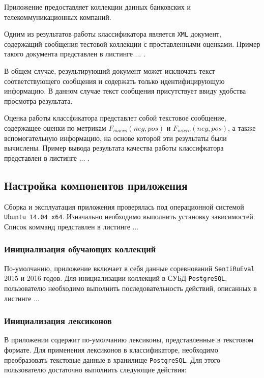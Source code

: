     Приложение предоставляет коллекции данных банковских и телекоммуникационных
    компаний.

    Одним из результатов работы классификатора является {\tt XML} документ,
    содержащий сообщения тестовой коллекции с проставленными оценками.
    Пример такого документа представлен в листинге ... .


    В общем случае, результирующий документ
    может исключать текст соответствующего сообщения и содержать только
    идентифицирующую информацию. В данном случае текст сообщения присутствует
    ввиду удобства просмотра результата.

    Оценка работы классфикатора представлет собой текстовое сообщение,
    содержащее оценки по метрикам  $F_{macro}(neg, pos)$ и $F_{micro}(neg, pos)$,
    а также вспомогательную информацию, на основе которой эти результаты были
    вычислены. Пример вывода результата качества работы классифкатора представлен
    в листинге ... .

    \subsection{Настройка компонентов приложения}
    Сборка и эксплуатация приложения проверялась под операционной системой
    {\tt Ubuntu 14.04 x64}. Изначально необходимо выполнить установку зависимостей.
    Список комманд представлен в листинге ...

        \subsubsection{Инициализация обучающих коллекций}
        По-умолчанию, приложение включает в себя данные соревнований {\tt SentiRuEval}
        2015 и 2016 годов. Для инициализации коллекций в СУБД {\tt PostgreSQL},
        пользователю необходимо выполнить последовательность действий, описанных
        в листинге ...

        \subsubsection{Инициализация лексиконов}
        В приложении содержит по-умолчанию лексиконы, представленные в текстовом
        формате. Для применения лексиконов в классификаторе, необходимо преобразовать
        текстовые данные в хранилище {\tt PostgreSQL}. Для этого пользователю
        достаточно выполнить следующие действия:

